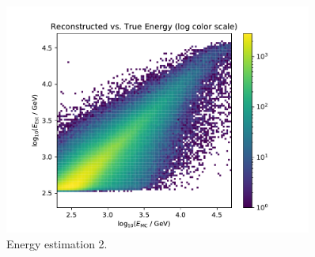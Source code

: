 \begin{figure}
  \centering
  \includegraphics[width=0.9\textwidth, page=3]{Plots/results/DBSCAN/energy_performance.pdf}
  \caption{Energy estimation 2.}
  \label{fig:energy2}
\end{figure}
%



